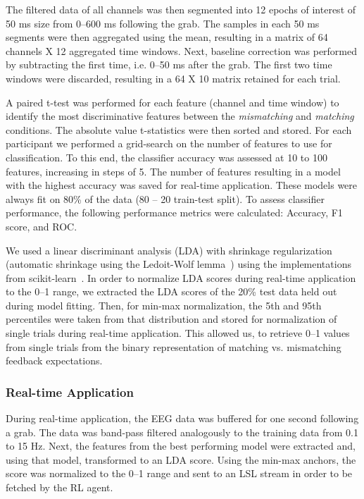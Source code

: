 The filtered data of all channels was then segmented into 12 epochs of interest of 50 ms size from 0--600 ms following the grab. The samples in each 50 ms segments were then aggregated using the mean, resulting in a matrix of 64 channels X 12 aggregated time windows. Next, baseline correction was performed by subtracting the first time, i.e. 0--50 ms after the grab. The first two time windows were discarded, resulting in a 64 X 10 matrix retained for each trial.

A paired t-test was performed for each feature (channel and time window) to identify the most discriminative features between the \textit{mismatching} and \textit{matching} conditions. The absolute value t-statistics were then sorted and stored. For each participant we performed a grid-search on the number of features to use for classification. To this end, the classifier accuracy was assessed at 10 to 100 features, increasing in steps of 5. The number of features resulting in a model with the highest accuracy was saved for real-time application. These models were always fit on 80\% of the data (80 -- 20 train-test split). To assess classifier performance, the following performance metrics were calculated: Accuracy, F1 score, and ROC.

We used a linear discriminant analysis (LDA) with shrinkage regularization (automatic shrinkage using the Ledoit-Wolf lemma~\cite{Ledoit2004-bi}) using the implementations from scikit-learn~\cite{Pedregosa2012-sj}. In order to normalize LDA scores during real-time application to the 0--1 range, we extracted the LDA scores of the 20\% test data held out during model fitting. Then, for min-max normalization, the 5th and 95th percentiles were taken from that distribution and stored for normalization of single trials during real-time application. This allowed us, to retrieve 0--1 values from single trials from the binary representation of matching vs. mismatching feedback expectations.

\subsubsection{Real-time Application}
During real-time application, the EEG data was buffered for one second following a grab. The data was band-pass filtered analogously to the training data from 0.1 to 15 Hz. Next, the features from the best performing model were extracted and, using that model, transformed to an LDA score. Using the min-max anchors, the score was normalized to the 0--1 range and sent to an LSL stream in order to be fetched by the RL agent.

